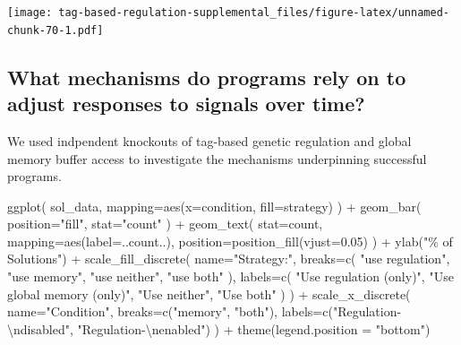 \documentclass[
]{book}
\newenvironment{Shaded}{\begin{snugshade}}{\end{snugshade}}
\newcommand{\AttributeTok}[1]{\textcolor[rgb]{0.77,0.63,0.00}{#1}}
\newcommand{\FloatTok}[1]{\textcolor[rgb]{0.00,0.00,0.81}{#1}}
\newcommand{\FunctionTok}[1]{\textcolor[rgb]{0.00,0.00,0.00}{#1}}
\newcommand{\NormalTok}[1]{#1}
\newcommand{\SpecialCharTok}[1]{\textcolor[rgb]{0.00,0.00,0.00}{#1}}
\newcommand{\StringTok}[1]{\textcolor[rgb]{0.31,0.60,0.02}{#1}}
\begin{document}
\texttt{[image: tag-based-regulation-supplemental\_files/figure-latex/unnamed-chunk-70-1.pdf]}

\hypertarget{what-mechanisms-do-programs-rely-on-to-adjust-responses-to-signals-over-time-1}{%
\subsection{What mechanisms do programs rely on to adjust responses to signals over time?}\label{what-mechanisms-do-programs-rely-on-to-adjust-responses-to-signals-over-time-1}}

We used indpendent knockouts of tag-based genetic regulation and global memory buffer access to investigate the mechanisms underpinning successful programs.

\begin{Shaded}
\begin{Highlighting}[]
\FunctionTok{ggplot}\NormalTok{( sol\_data, }\AttributeTok{mapping=}\FunctionTok{aes}\NormalTok{(}\AttributeTok{x=}\NormalTok{condition, }\AttributeTok{fill=}\NormalTok{strategy) ) }\SpecialCharTok{+}
  \FunctionTok{geom\_bar}\NormalTok{(}
    \AttributeTok{position=}\StringTok{"fill"}\NormalTok{,}
    \AttributeTok{stat=}\StringTok{"count"}
\NormalTok{  ) }\SpecialCharTok{+}
  \FunctionTok{geom\_text}\NormalTok{(}
    \AttributeTok{stat=}\StringTok{\textquotesingle{}count\textquotesingle{}}\NormalTok{,}
    \AttributeTok{mapping=}\FunctionTok{aes}\NormalTok{(}\AttributeTok{label=}\NormalTok{..count..),}
    \AttributeTok{position=}\FunctionTok{position\_fill}\NormalTok{(}\AttributeTok{vjust=}\FloatTok{0.05}\NormalTok{)}
\NormalTok{  ) }\SpecialCharTok{+}
  \FunctionTok{ylab}\NormalTok{(}\StringTok{"\% of Solutions"}\NormalTok{) }\SpecialCharTok{+}
  \FunctionTok{scale\_fill\_discrete}\NormalTok{(}
    \AttributeTok{name=}\StringTok{"Strategy:"}\NormalTok{,}
    \AttributeTok{breaks=}\FunctionTok{c}\NormalTok{(}
      \StringTok{"use regulation"}\NormalTok{,}
      \StringTok{"use memory"}\NormalTok{,}
      \StringTok{"use neither"}\NormalTok{,}
      \StringTok{"use both"}
\NormalTok{    ),}
    \AttributeTok{labels=}\FunctionTok{c}\NormalTok{(}
      \StringTok{"Use regulation (only)"}\NormalTok{,}
      \StringTok{"Use global memory (only)"}\NormalTok{,}
      \StringTok{"Use neither"}\NormalTok{,}
      \StringTok{"Use both"}
\NormalTok{    )}
\NormalTok{  ) }\SpecialCharTok{+}
  \FunctionTok{scale\_x\_discrete}\NormalTok{(}
    \AttributeTok{name=}\StringTok{"Condition"}\NormalTok{,}
    \AttributeTok{breaks=}\FunctionTok{c}\NormalTok{(}\StringTok{"memory"}\NormalTok{, }\StringTok{"both"}\NormalTok{),}
    \AttributeTok{labels=}\FunctionTok{c}\NormalTok{(}\StringTok{"Regulation{-}}\SpecialCharTok{\textbackslash{}n}\StringTok{disabled"}\NormalTok{, }\StringTok{"Regulation{-}}\SpecialCharTok{\textbackslash{}n}\StringTok{enabled"}\NormalTok{)}
\NormalTok{  ) }\SpecialCharTok{+}
  \FunctionTok{theme}\NormalTok{(}\AttributeTok{legend.position =} \StringTok{"bottom"}\NormalTok{)}
\end{Highlighting}
\end{Shaded}
\end{document}
